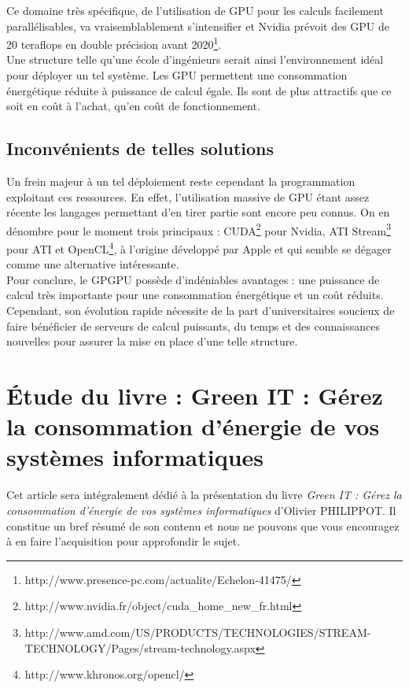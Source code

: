 \documentclass[a4paper,11pt,french]{report}
\begin{document}
Ce domaine très spécifique, de l'utilisation de GPU pour les calculs facilement parallélisables, va vraisemblablement s’intensifier et Nvidia prévoit des GPU de 20 teraflops en double précision avant 2020\footnote{\textsf{http://www.presence-pc.com/actualite/Echelon-41475/}}.\\

Une structure telle qu’une école d’ingénieurs serait ainsi l’environnement idéal pour déployer un tel système. Les GPU permettent une consommation énergétique réduite à puissance de calcul égale. Ils sont de plus attractifs que ce soit en coût à l’achat, qu’en coût de fonctionnement.\\

\subsection{Inconvénients de telles solutions}
Un frein majeur à un tel déploiement reste cependant la programmation exploitant ces ressources. En effet, l'utilisation massive de GPU étant assez récente les langages permettant d'en tirer partie sont encore peu connus. On en dénombre pour le moment trois principaux : CUDA\footnote{\textsf{http://www.nvidia.fr/object/cuda\_{}home\_{}new\_{}fr.html}} pour Nvidia, ATI Stream\footnote{\textsf{http://www.amd.com/US/PRODUCTS/TECHNOLOGIES/STREAM-TECHNOLOGY/Pages/stream-technology.aspx}} pour ATI et OpenCL\footnote{\textsf{http://www.khronos.org/opencl/}}, à l'origine développé par Apple et qui semble se dégager comme une alternative intéressante.\\

Pour conclure, le GPGPU possède d'indéniables avantages : une puissance de calcul très importante pour une consommation énergétique et un coût réduits. Cependant, son évolution rapide nécessite de la part d'universitaires soucieux de faire bénéficier de serveurs de calcul puissants, du temps et des connaissances nouvelles pour assurer la mise en place d'une telle structure.\\




\section[\'Etude d'un livre]{\'Etude du livre : \og Green IT : Gérez la consommation d'énergie de vos systèmes informatiques \fg}

Cet article sera intégralement dédié à la présentation du livre \emph{Green IT : Gérez la consommation d'énergie de vos systèmes informatiques}\cite{GreenIT2} d’Olivier PHILIPPOT. Il constitue un bref résumé de son contenu et nous ne pouvons que vous encouragez à en faire l’acquisition pour approfondir le sujet.\\
\end{document}
